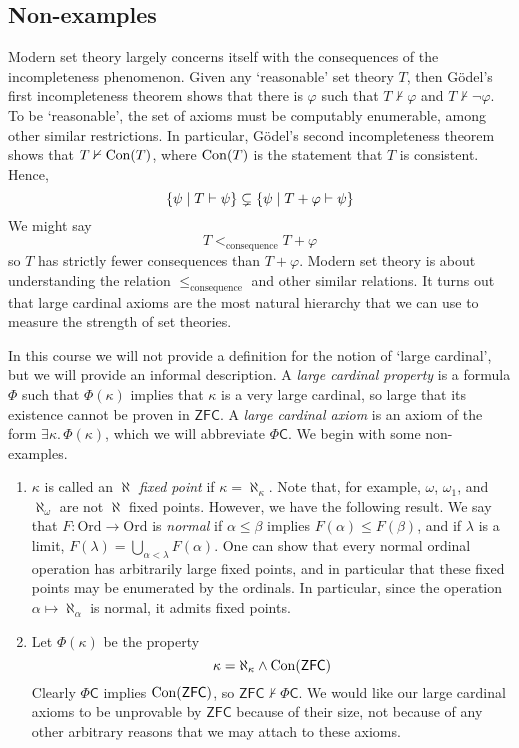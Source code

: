 \subsection{Non-examples}
Modern set theory largely concerns itself with the consequences of the incompleteness phenomenon.
Given any `reasonable' set theory \( T \), then G\"odel's first incompleteness theorem shows that there is \( \varphi \) such that \( T \nvdash \varphi \) and \( T \nvdash \neg\varphi \).
To be `reasonable', the set of axioms must be computably enumerable, among other similar restrictions.
In particular, G\"odel's second incompleteness theorem shows that \( T \nvdash \operatorname{Con}(T) \), where \( \operatorname{Con}(T) \) is the statement that \( T \) is consistent.
Hence,
\[ \qty{\psi \mid T \vdash \psi} \subsetneq \qty{\psi \mid T + \varphi \vdash \psi} \]
We might say
\[ T <_{\text{consequence}} T + \varphi \]
so \( T \) has strictly fewer consequences than \( T + \varphi \).
Modern set theory is about understanding the relation \( \leq_{\text{consequence}} \) and other similar relations.
It turns out that large cardinal axioms are the most natural hierarchy that we can use to measure the strength of set theories.

In this course we will not provide a definition for the notion of `large cardinal', but we will provide an informal description.
A \emph{large cardinal property} is a formula \( \Phi \) such that \( \Phi(\kappa) \) implies that \( \kappa \) is a very large cardinal, so large that its existence cannot be proven in \( \mathsf{ZFC} \).
A \emph{large cardinal axiom} is an axiom of the form \( \exists \kappa.\, \Phi(\kappa) \), which we will abbreviate \( \Phi \mathsf{C} \).
We begin with some non-examples.

\begin{enumerate}
    \item \( \kappa \) is called an \emph{\( \aleph \) fixed point} if \( \kappa = \aleph_\kappa \).
    Note that, for example, \( \omega \), \( \omega_1 \), and \( \aleph_\omega \) are not \( \aleph \) fixed points.
    However, we have the following result.
    We say that \( F : \mathrm{Ord} \to \mathrm{Ord} \) is \emph{normal} if \( \alpha \leq \beta \) implies \( F(\alpha) \leq F(\beta) \), and if \( \lambda \) is a limit, \( F(\lambda) = \bigcup_{\alpha < \lambda} F(\alpha) \).
    One can show that every normal ordinal operation has arbitrarily large fixed points, and in particular that these fixed points may be enumerated by the ordinals.
    In particular, since the operation \( \alpha \mapsto \aleph_\alpha \) is normal, it admits fixed points.
    \item Let \( \Phi(\kappa) \) be the property
    \[ \kappa = \aleph_\kappa \wedge \operatorname{Con}(\mathsf{ZFC}) \]
    Clearly \( \Phi \mathsf{C} \) implies \( \operatorname{Con}(\mathsf{ZFC}) \), so \( \mathsf{ZFC} \nvdash \Phi \mathsf{C} \).
    We would like our large cardinal axioms to be unprovable by \( \mathsf{ZFC} \) because of their size, not because of any other arbitrary reasons that we may attach to these axioms.
\end{enumerate}


